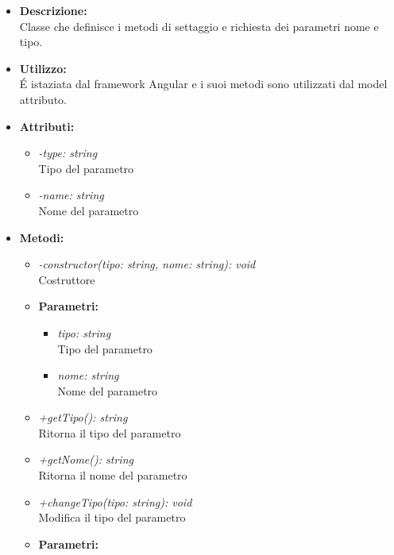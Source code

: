 				\begin{itemize}
          			\item \textbf{Descrizione:}\\
          			Classe che definisce i metodi di settaggio e richiesta dei parametri nome e tipo.
          			\item \textbf{Utilizzo:}\\
          			É istaziata dal framework Angular e i suoi metodi sono utilizzati dal model attributo.
          			\item \textbf{Attributi:}\\
          			\begin{itemize}
          				\item \emph{-type: string}\\
            			Tipo del parametro
            			\item \emph{-name: string}\\
            			Nome del parametro
          			\end{itemize}
          			\item \textbf{Metodi:}\\
          			\begin{itemize}
          				\item \emph{-constructor(tipo: string, nome: string): void}\\
            			Costruttore
            			\item \textbf{Parametri:}\\
            				\begin{itemize}
            					\item \emph{tipo: string}\\
            					Tipo del parametro
            					\item \emph{nome: string}\\
            					Nome del parametro
            				\end{itemize}
            			\item \emph{+getTipo(): string}\\
            			Ritorna il tipo del parametro
            			\item \emph{+getNome(): string}\\
            			Ritorna il nome del parametro
            			\item \emph{+changeTipo(tipo: string): void}\\
            			Modifica il tipo del parametro
            			\item \textbf{Parametri:}\\

\end{itemize}
\end{itemize}
